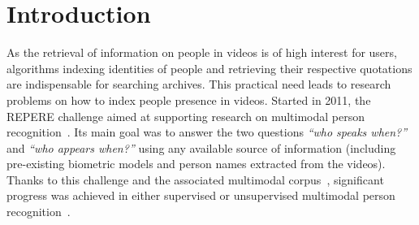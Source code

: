 \section{Introduction}

As the retrieval of information on people in videos is of high interest for users, algorithms indexing identities of people and retrieving their respective quotations are indispensable for searching archives. This practical need leads to research problems on how to index people presence in videos.
%
%
%
Started in 2011, the REPERE challenge aimed at supporting research on multimodal person recognition~\cite{BERNARD--SLAM--2013, GIRAUDEL--LREC--2012}. Its main goal was to answer the two questions \emph{``who speaks when?''} and \emph{``who appears when?''} using any available source of information (including pre-existing biometric models and person names extracted from the videos).
%
Thanks to this challenge and the associated multimodal corpus~\cite{GIRAUDEL--LREC--2012}, significant progress was achieved in either supervised or unsupervised multimodal person recognition~\cite{BECHET--INTERSPEECH--2014, BREDIN--IJMIR--2014, GAY--CBMI--2014, poignant2012fusion, ROUVIER--CBMI--2014}.

